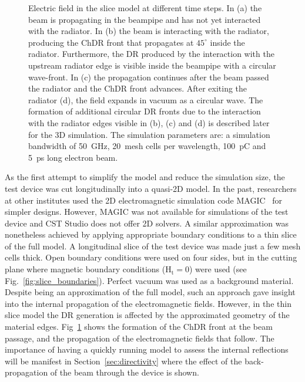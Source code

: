 \begin{figure}[!b]
\caption{Electric field in the slice model at different time steps. In (a) the beam is propagating in the beampipe and has not yet interacted with the radiator. In (b) the beam is interacting with the radiator, producing the ChDR front that propagates at $45^\circ$ inside the radiator. Furthermore, the DR produced by the interaction with the upstream radiator edge is visible inside the beampipe with a circular wave-front. In (c) the propagation continues after the beam passed the radiator and the ChDR front advances. After exiting the radiator (d), the field expands in vacuum as a circular wave. The formation of additional circular DR fronts due to the interaction with the radiator edges visible in (b), (c) and (d) is described later for the 3D simulation. The simulation parameters are: a simulation bandwidth of 50~GHz, 20~mesh cells per wavelength, 100~pC and 5~ps long electron beam.}
\label{fig:slice_forward propagation}
\end{figure}


As the first attempt to simplify the model and reduce the simulation size, the test device was cut longitudinally into a quasi-2D model. In the past, researchers at other institutes used the 2D electromagnetic simulation code MAGIC~\cite{MAGIC} for simpler designs. However, MAGIC was not available for simulations of the test device and CST Studio does not offer 2D solvers. A similar approximation was nonetheless achieved by applying appropriate boundary conditions to a thin slice of the full model. A longitudinal slice of the test device was made just a few mesh cells thick. Open boundary conditions were used on four sides, but in the cutting plane where magnetic boundary conditions (${\text{H}_\text{t}=0}$) were used (see Fig.~\ref{fig:slice_boundaries}). Perfect vacuum was used as a background material. Despite being an approximation of the full model, such an approach gave insight into the internal propagation of the electromagnetic fields. However, in the thin slice model the DR generation is affected by the approximated geometry of the material edges. Fig~\ref{fig:slice_forward propagation} shows the formation of the ChDR front at the beam passage, and the propagation of the electromagnetic fields that follow. The importance of having a quickly running model to assess the internal reflections will be manifest in Section~\ref{sec:directivity} where the effect of the back-propagation of the beam through the device is shown. 








